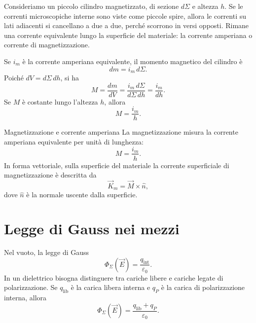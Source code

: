 \documentclass[a4paper]{article}
\begin{document}
Consideriamo un piccolo cilindro magnetizzato, di sezione \(d\Sigma\) e altezza \(h\). Se le correnti microscopiche interne sono viste come piccole spire, allora le correnti su lati adiacenti si cancellano a due a due, perché scorrono in versi opposti. Rimane una corrente equivalente lungo la superficie del materiale: la corrente amperiana o corrente di magnetizzazione.

Se \(i_m\) è la corrente amperiana equivalente, il momento magnetico del cilindro è
\[
dm=i_m\,d\Sigma.
\]
Poiché \(dV=d\Sigma\,dh\), si ha
\[
M=\frac{dm}{dV}
=\frac{i_m\,d\Sigma}{d\Sigma\,dh}
=\frac{i_m}{dh}.
\]
Se \(M\) è costante lungo l'altezza \(h\), allora
\[
M=\frac{i_m}{h}.
\]

\begin{snippetproposition}{Magnetizzazione e corrente amperiana}
La magnetizzazione misura la corrente amperiana equivalente per unità di lunghezza:
\[
    M=\frac{i_m}{h}.
\]
In forma vettoriale, sulla superficie del materiale la corrente superficiale di magnetizzazione è descritta da
\[
    \vec{K}_m=\vec{M}\times\hat{n},
\]
dove \(\hat{n}\) è la normale uscente dalla superficie.
\end{snippetproposition}

\begin{center}
\end{center}

\section{Legge di Gauss nei mezzi}

Nel vuoto, la legge di Gauss
\[
\Phi_\Sigma(\vec{E})=\frac{q_{\mathrm{int}}}{\varepsilon_0}.
\]
In un dielettrico bisogna distinguere tra cariche libere e cariche legate di polarizzazione. Se \(q_{\mathrm{lib}}\) è la carica libera interna e \(q_P\) è la carica di polarizzazione interna, allora
\[
\Phi_\Sigma(\vec{E})=\frac{q_{\mathrm{lib}}+q_P}{\varepsilon_0}.
\]
\end{document}
